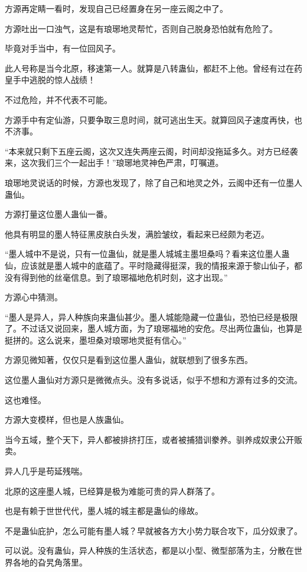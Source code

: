 
\begin{this_body}

方源再定睛一看时，发现自己已经置身在另一座云阁之中了。

方源吐出一口浊气，这是有琅琊地灵帮忙，否则自己脱身恐怕就有危险了。

毕竟对手当中，有一位回风子。

此人号称是当今北原，移速第一人。就算是八转蛊仙，都赶不上他。曾经有过在药皇手中逃脱的惊人战绩！

不过危险，并不代表不可能。

方源手中有定仙游，只要争取三息时间，就可逃出生天。就算回风子速度再快，也不济事。

“本来就只剩下五座云阁，这次又连失两座云阁，时间却没拖延多久。对方已经袭来，这次我们三个一起出手！”琅琊地灵神色严肃，叮嘱道。

琅琊地灵说话的时候，方源也发现了，除了自己和地灵之外，云阁中还有一位墨人蛊仙。

方源打量这位墨人蛊仙一番。

他具有明显的墨人特征黑皮肤白头发，满脸皱纹，看起来已经颇为老迈。

“墨人城中不是说，只有一位蛊仙，就是墨人城城主墨坦桑吗？看来这位墨人蛊仙，应该就是墨人城中的底蕴了。平时隐藏得挺深，我的情报来源于黎山仙子，都没有得到他的丝毫信息。到了琅琊福地危机时刻，这才出现。”

方源心中猜测。

“墨人是异人，异人种族向来蛊仙甚少。墨人城能隐藏一位蛊仙，恐怕已经是极限了。不过话又说回来，墨人城方面，为了琅琊福地的安危。尽出两位蛊仙，也算是挺拼的。这么说来，墨坦桑对琅琊地灵挺有信心。”

方源见微知著，仅仅只是看到这位墨人蛊仙，就联想到了很多东西。

这位墨人蛊仙对方源只是微微点头。没有多说话，似乎不想和方源有过多的交流。

这也难怪。

方源大变模样，但也是人族蛊仙。

当今五域，整个天下，异人都被排挤打压，或者被捕猎训豢养。驯养成奴隶公开贩卖。

异人几乎是苟延残喘。

北原的这座墨人城，已经算是极为难能可贵的异人群落了。

也是有赖于世世代代，墨人城的城主都是蛊仙的缘故。

不是蛊仙庇护，怎么可能有墨人城？早就被各方大小势力联合攻下，瓜分奴隶了。

可以说。没有蛊仙，异人种族的生活状态，都是以小型、微型部落为主，分散在世界各地的旮旯角落里。


\end{this_body}
